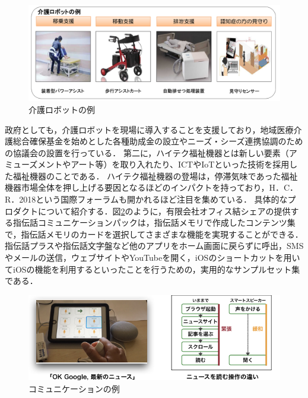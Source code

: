 \begin{figure}[htb]
 \begin{center}
 \includegraphics[scale=0.6]{figures/care_robots}
 \caption[介護ロボットの例]{介護ロボットの例 \label{care_robots}}
 \end{center}
\end{figure}

政府としても，介護ロボットを現場に導入することを支援しており，地域医療介護総合確保基金を始めとした各種助成金の設立やニーズ・シーズ連携協調のための協議会の設置を行っている．
第二に，ハイテク福祉機器とは新しい要素（アミューズメントやアート等）を取り入れたり、ICTやIoTといった技術を採用した福祉機器のことである．
ハイテク福祉機器の登場は，停滞気味であった福祉機器市場全体を押し上げる要因となるほどのインパクトを持っており，H．C．R．2018という国際フォーラムも開かれるほど注目を集めている．
具体的なプロダクトについて紹介する．図\ref{yubicommnnication}のように，有限会社オフィス結シェアの提供する指伝話コミュニケーションパックは，指伝話メモリで作成したコンテンツ集で，指伝話メモリのカードを選択してさまざまな機能を実現することができる．指伝話プラスや指伝話文字盤など他のアプリをホーム画面に戻らずに呼出，SMSやメールの送信，ウェブサイトやYouTubeを開く，iOSのショートカットを用いてiOSの機能を利用するといったことを行うための，実用的なサンプルセット集である．

\begin{figure}[htb]
 \begin{center}
 \includegraphics[scale=0.6]{figures/yubicommunication.png}
 \caption[コミュニケーションの例]{コミュニケーションの例 \label{yubicommnnication}}
 \end{center}
\end{figure}

